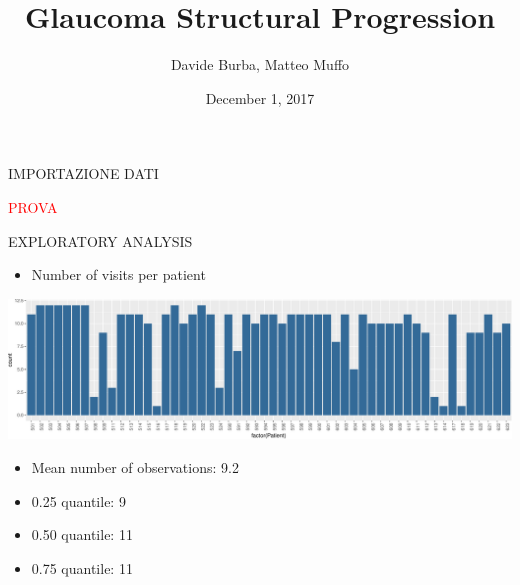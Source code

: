 \documentclass[ignorenonframetext,]{beamer}
\title{Glaucoma Structural Progression}
\author{Davide Burba, Matteo Muffo}
\date{December 1, 2017}
\providecommand{\tightlist}{%
  \setlength{\itemsep}{0pt}\setlength{\parskip}{0pt}}
\begin{document}
\frame{\titlepage}

\begin{frame}{IMPORTAZIONE DATI}

\textcolor{red}{PROVA}

\end{frame}

\begin{frame}{EXPLORATORY ANALYSIS}

\begin{itemize}
\tightlist
\item
  Number of visits per patient
\end{itemize}

\includegraphics{analisi_exp_markdown_files/figure-beamer/unnamed-chunk-2-1.pdf}

\begin{itemize}
\tightlist
\item
  Mean number of observations: 9.2
\item
  0.25 quantile: 9
\item
  0.50 quantile: 11
\item
  0.75 quantile: 11
\end{itemize}

\end{frame}
\end{document}
